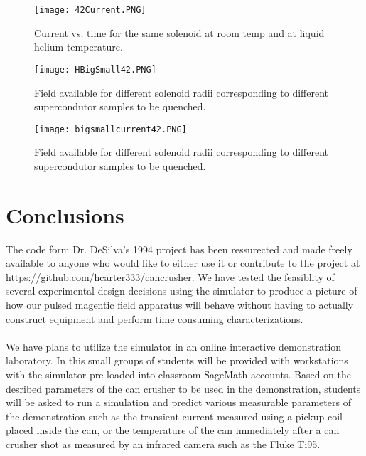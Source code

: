 \documentclass[prb,preprint]{revtex4-1}
\begin{document}
\begin{figure}[page]
\centering
\texttt{[image: 42Current.PNG]}
\caption{Current vs. time for the same solenoid at room temp and at liquid helium temperature.}
\label{sunsets}
\end{figure}
\begin{figure}[h!]
\centering
\texttt{[image: HBigSmall42.PNG]}
\caption{Field available for different solenoid radii corresponding to different supercondutor samples to be quenched.}
\label{sunsets}
\end{figure}
\begin{figure}[h!]
\centering
\texttt{[image: bigsmallcurrent42.PNG]}
\caption{Field available for different solenoid radii corresponding to different supercondutor samples to be quenched.}
\label{sunsets}
\end{figure}
\section{Conclusions}
The code form Dr. DeSilva's 1994 project has been ressurected and made freely available to anyone who would like to either use it or contribute to the project at \url{https://github.com/hcarter333/cancrusher}.  We have tested the feasiblity of several experimental design decisions using the simulator to produce a picture of how our pulsed magentic field apparatus will behave without having to actually construct equipment and perform time consuming characterizations.
\\
\\
We have plans to utilize the simulator in an online interactive demonstration laboratory\cite{ILD}.  In this small groups of students will be provided with workstations with the simulator pre-loaded into classroom SageMath accounts.  Based on the desribed parameters of the can crusher to be used in the demonstration, students will be asked to run a simulation and predict various measurable parameters of the demonstration such as the transient current measured using a pickup coil placed inside the can, or the temperature of the can immediately after a can crusher shot as measured by an infrared camera such as the Fluke Ti95.
\end{document}
